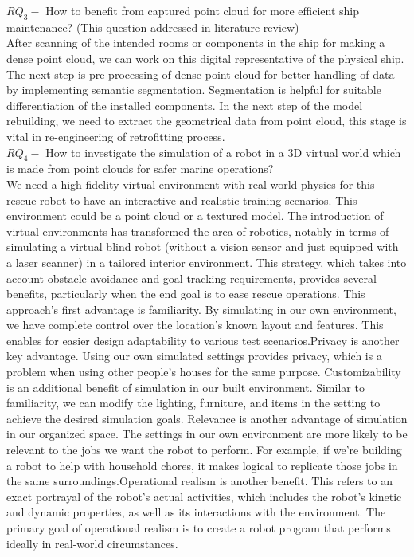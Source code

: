 \noindent $RQ_3-$  How to benefit from captured point cloud for more efficient ship maintenance? (This question addressed in literature review)\\
After scanning of the intended rooms or components in the ship for making a dense point cloud, we can work on this digital representative of the physical ship.  
The next step is pre-processing of dense point cloud for better handling of data by implementing semantic segmentation. Segmentation is helpful for suitable differentiation of the installed components. In the next step of the model rebuilding, we need to extract the geometrical data from point cloud, this stage is vital in re-engineering of retrofitting process. \\

\noindent $RQ_4-$ How to investigate the simulation of a robot in a 3D virtual world which is made from point clouds for safer marine operations?\\
We need a high fidelity virtual environment with real-world physics for this rescue robot to have an interactive and realistic training scenarios. This environment could be a point cloud or a textured model. The introduction of virtual environments has transformed the area of robotics, notably in terms of simulating a virtual blind robot (without a vision sensor and just equipped with a laser scanner) in a tailored interior environment. This strategy, which takes into account obstacle avoidance and goal tracking requirements, provides several benefits, particularly when the end goal is to ease rescue operations. This approach's first advantage is familiarity. By simulating in our own environment, we have complete control over the location's known layout and features. This enables for easier design adaptability to various test scenarios.Privacy is another key advantage. Using our own simulated settings provides privacy, which is a problem when using other people's houses for the same purpose.
Customizability is an additional benefit of simulation in our built environment. Similar to familiarity, we can modify the lighting, furniture, and items in the setting to achieve the desired simulation goals.
Relevance is another advantage of simulation in our organized space. The settings in our own environment are more likely to be relevant to the jobs we want the robot to perform. For example, if we're building a robot to help with household chores, it makes logical to replicate those jobs in the same surroundings.Operational realism is another benefit. This refers to an exact portrayal of the robot's actual activities, which includes the robot's kinetic and dynamic properties, as well as its interactions with the environment. The primary goal of operational realism is to create a robot program that performs ideally in real-world circumstances.
